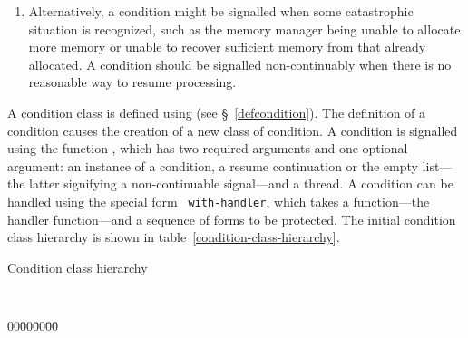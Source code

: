 \begin{optDefinition}
\begin{enumerate}
    \item {} Alternatively, a condition
    might be signalled when some catastrophic situation is recognized, such as
    the memory manager being unable to allocate more memory or unable to recover
    sufficient memory from that already allocated.  A condition should be
    signalled non-continuably when there is no reasonable way to resume
    processing.
\end{enumerate}
%
A condition class is defined using  (see
\S~\ref{defcondition}).  The definition of a condition causes the
creation of a new class of condition.  A condition is signalled using
the function , which has two required arguments and one
optional argument: an instance of a condition, a resume continuation
or the empty list---the latter signifying a non-continuable signal---and a
thread.  A condition can be handled using the special form {\tt
with-handler}, which takes a function---the handler function---and a
sequence of forms to be protected.  The initial condition class
hierarchy is shown in table~\ref{condition-class-hierarchy}.
%
\begin{table}%
\caption{Condition class hierarchy}%
\label{condition-class-hierarchy}%
{\tt%
    \begin{tabbing}%
    00\=00\=00\=00\= \kill%
     \\
    \> \\
    \>\> \\
    \>\> \\
    \>\> \\
    \> \\
    \> \\
    \>\>  \\
    \> \\
    \>\> \\
    \> \\
    \>\> \\
    \> \\
    \> \\
    \>\> \\

\end{tabbing}}
\end{table}
\end{optDefinition}
